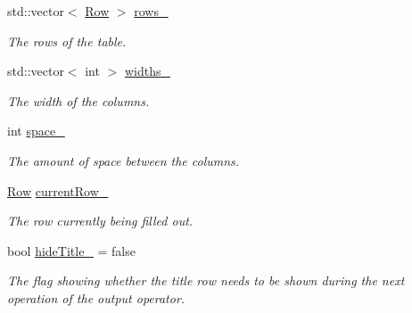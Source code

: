 \begin{DoxyCompactItemize}
\item 
std\+::vector$<$ \hyperlink{structRow}{Row} $>$ \hyperlink{structTable_aa7b3161fb0275bbecef8a79c4ecb7c0f}{rows\+\_\+}\hypertarget{structTable_aa7b3161fb0275bbecef8a79c4ecb7c0f}{}\label{structTable_aa7b3161fb0275bbecef8a79c4ecb7c0f}

\begin{DoxyCompactList}\small\item\em The rows of the table. \end{DoxyCompactList}\item 
std\+::vector$<$ int $>$ \hyperlink{structTable_ae6d94495268d7ab8df8ae5a6aeb20064}{widths\+\_\+}\hypertarget{structTable_ae6d94495268d7ab8df8ae5a6aeb20064}{}\label{structTable_ae6d94495268d7ab8df8ae5a6aeb20064}

\begin{DoxyCompactList}\small\item\em The width of the columns. \end{DoxyCompactList}\item 
int \hyperlink{structTable_a7f8abf0b8caf14b0c3d120d0579cdea5}{space\+\_\+}\hypertarget{structTable_a7f8abf0b8caf14b0c3d120d0579cdea5}{}\label{structTable_a7f8abf0b8caf14b0c3d120d0579cdea5}

\begin{DoxyCompactList}\small\item\em The amount of space between the columns. \end{DoxyCompactList}\item 
\hyperlink{structRow}{Row} \hyperlink{structTable_ac86d109fd6f2e620f8a330ee6034348f}{current\+Row\+\_\+}\hypertarget{structTable_ac86d109fd6f2e620f8a330ee6034348f}{}\label{structTable_ac86d109fd6f2e620f8a330ee6034348f}

\begin{DoxyCompactList}\small\item\em The row currently being filled out. \end{DoxyCompactList}\item 
bool \hyperlink{structTable_a195f6d38a4d3bc91577b5d4f08137bca}{hide\+Title\+\_\+} = false\hypertarget{structTable_a195f6d38a4d3bc91577b5d4f08137bca}{}\label{structTable_a195f6d38a4d3bc91577b5d4f08137bca}

\begin{DoxyCompactList}\small\item\em The flag showing whether the title row needs to be shown during the next operation of the output operator. \end{DoxyCompactList}\end{DoxyCompactItemize}
